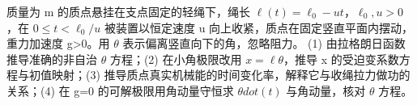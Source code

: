 质量为 m 的质点悬挂在支点固定的轻绳下，绳长 \(\ell (t)=\ell _{0}-ut\)，\(\ell _{0},u>0\)，在 \(0\le t<\ell _{0}/u\) 被装置以恒定速度 u 向上收紧，质点在固定竖直平面内摆动，重力加速度 g>0。用 \(\theta \) 表示偏离竖直向下的角，忽略阻力。
(1) 由拉格朗日函数推导准确的非自治 \(\theta \) 方程；(2) 在小角极限改用 \(x=\ell \theta \)，推导 x 的受迫变系数方程与初值映射；(3) 推导质点真实机械能的时间变化率，解释它与收绳拉力做功的关系；(4) 在 g=0 的可解极限用角动量守恒求 \(\theta dot(t)\) 与角动量，核对 \(\theta \) 方程。
